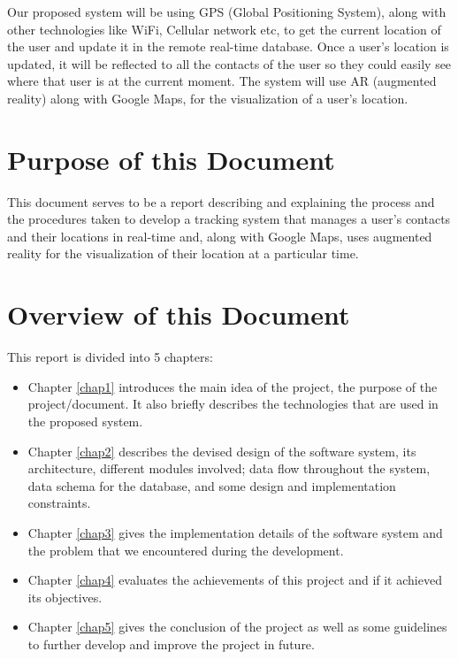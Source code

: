 Our proposed system will be using GPS (Global Positioning System), along with other technologies like WiFi, Cellular network etc, to get the current location of the user and update it in the remote real-time database. Once a user's location is updated, it will be reflected to all the contacts of the user so they could easily see where that user is at the current moment. The system will use AR (augmented reality) along with Google Maps, for the visualization of a user's location. 

\section{Purpose of this Document}
This document serves to be a report describing and explaining the process and the procedures taken to develop a tracking system that manages a user's contacts and their locations in real-time and, along with Google Maps, uses augmented reality for the visualization of their location at a particular time.

\section{Overview of this Document}
This report is divided into 5 chapters:
\begin{itemize}
	  \item Chapter \ref{chap1} introduces the main idea of the project, the purpose of the project/document. It also briefly describes the technologies that are used in the proposed system.
    \item Chapter \ref{chap2} describes the devised design of the software system, its architecture, different modules involved; data flow throughout the system, data schema for the database, and some design and implementation constraints.
    \item Chapter \ref{chap3} gives the implementation details of the software system and the problem that we encountered during the development.
    \item Chapter \ref{chap4} evaluates the achievements of this project and if it achieved its objectives.
    \item Chapter \ref{chap5} gives the conclusion of the project as well as some guidelines to further develop and improve the project in future.
\end{itemize}


